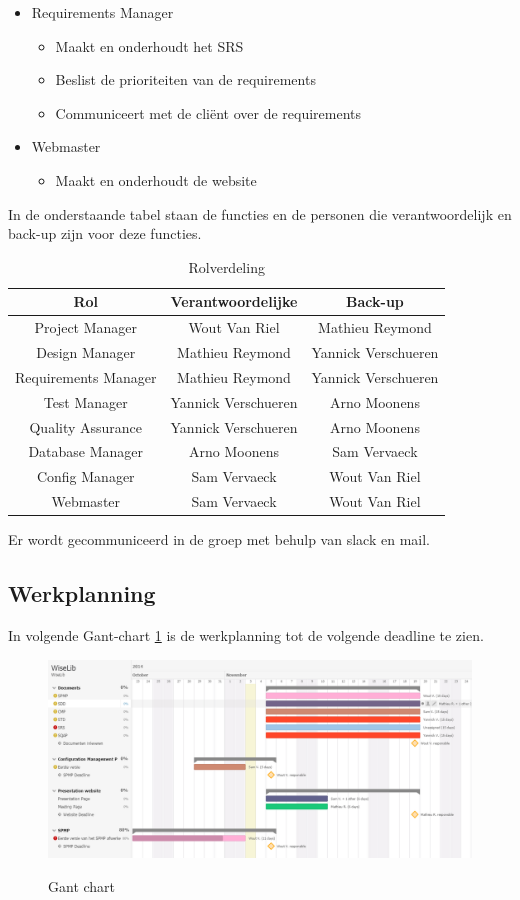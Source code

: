 \begin{itemize}
\item Requirements Manager
\begin{itemize}
\item Maakt en onderhoudt het SRS
\item Beslist de prioriteiten van de requirements
\item Communiceert met de cliënt over de requirements
\end{itemize}

\item Webmaster 
\begin{itemize}
\item Maakt en onderhoudt de website
\end{itemize}
\end{itemize}
 \newpage

In de onderstaande tabel staan de functies en de personen die verantwoordelijk en back-up zijn voor deze functies.

\begin{table}[h]
\centering
\begin{tabular}{c|c|c}
\textbf{Rol} & \textbf{Verantwoordelijke} & \textbf{Back-up}  \\
\hline
 Project Manager & Wout Van Riel & Mathieu Reymond \\
 Design Manager & Mathieu Reymond & Yannick Verschueren \\
 Requirements Manager & Mathieu Reymond & Yannick Verschueren \\
 Test Manager & Yannick Verschueren & Arno Moonens \\
 Quality Assurance & Yannick Verschueren & Arno Moonens \\
 Database Manager & Arno Moonens & Sam Vervaeck \\
 Config Manager & Sam Vervaeck & Wout Van Riel \\
 Webmaster & Sam Vervaeck & Wout Van Riel
\end{tabular}
\caption{Rolverdeling}
\label{tab:rolverdeling}
\end{table}

Er wordt gecommuniceerd in de groep met behulp van slack \cite{Slack} en mail. 

\subsection{Werkplanning}
In volgende Gant-chart \ref{fig:gant} is de werkplanning tot de volgende deadline te zien.
\newline

\begin{figure}[h]
    \begin{center}
        \href{run:./Gant_chart.png}{\includegraphics[width=1 \columnwidth]{Gant_chart.png}}
    \end{center}
    \caption{Gant chart}
    \label{fig:gant}
\end{figure}